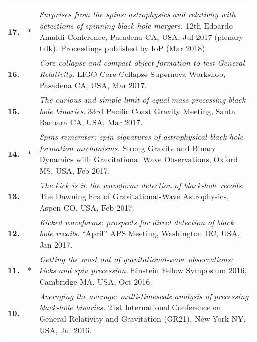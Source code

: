 \documentclass[letterpaper]{moderncv}
\begin{document}
{\begin{longtable}{rp{0.4cm}p{15.8cm}}
\vspace{0.05cm}\\
%
\textbf{17.} & * & \textit{Surprises from the spins: astrophysics and relativity with detections of spinning black-hole mergers.}
\newline{}12th Edoardo Amaldi Conference, Pasadena CA, USA, Jul 2017 (plenary talk).
\newline{}Proceedings published by IoP (Mar 2018).
\vspace{0.05cm}\\
%
\textbf{16.} & & \textit{Core collapse and compact-object formation to test General Relativity.}
\newline{}LIGO Core Collapse Supernova Workshop, Pasadena CA, USA, Mar 2017.
\vspace{0.05cm}\\
%
\textbf{15.} & & \textit{The curious and simple limit of equal-mass precessing black-hole binaries.}
\newline{}33rd Pacific Coast Gravity Meeting, Santa Barbara CA, USA, Mar 2017.
\vspace{0.05cm}\\
%
\textbf{14.} & * & \textit{Spins remember: spin signatures of astrophysical black hole formation mechanisms.}
\newline{}Strong Gravity and Binary Dynamics with Gravitational Wave Observations, Oxford MS, USA, Feb 2017.
\vspace{0.05cm}\\
%
\textbf{13.} & & \textit{The kick is in the waveform: detection of black-hole recoils.}
\newline{}The Dawning Era of Gravitational-Wave Astrophysics, Aspen CO, USA, Feb 2017.
\vspace{0.05cm}\\
%
\textbf{12.} & & \textit{Kicked waveforms: prospects for direct detection of black hole recoils.}
\newline{}``April'' APS Meeting, Washington DC, USA, Jan 2017.
\vspace{0.05cm}\\
%
\textbf{11.} & * & \textit{Getting the most out of gravitational-wave observations: kicks and spin precession.}
\newline{}Einstein Fellow Symposium 2016, Cambridge MA, USA, Oct 2016.
\vspace{0.05cm}\\
%
\textbf{10.} & & \textit{Averaging the average: multi-timescale analysis of precessing black-hole binaries.}
\newline{}21st International Conference on General Relativity and Gravitation (GR21), New York NY, USA, Jul 2016.

\end{longtable}}
\end{document}
